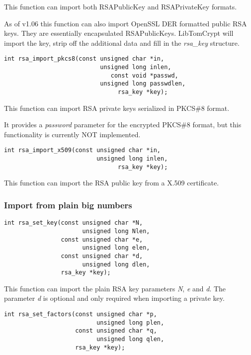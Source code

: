 \documentclass[synpaper]{book}
\begin{document}
This function can import both RSAPublicKey and RSAPrivateKey formats.

As of v1.06 this function can also import OpenSSL DER formatted public RSA keys.  They are essentially encapsulated RSAPublicKeys.  LibTomCrypt will
import the key, strip off the additional data and fill in the \textit{rsa\_key} structure.

\begin{verbatim}
int rsa_import_pkcs8(const unsigned char *in,
                           unsigned long inlen,
                              const void *passwd,
                           unsigned long passwdlen,
                                rsa_key *key);
\end{verbatim}

This function can import RSA private keys serialized in PKCS\#8 format.

It provides a \textit{password} parameter for the encrypted PKCS\#8 format, but this functionality is currently NOT implemented.

\begin{verbatim}
int rsa_import_x509(const unsigned char *in,
                          unsigned long inlen,
                                rsa_key *key);
\end{verbatim}

This function can import the RSA public key from a X.509 certificate.

\subsubsection{Import from plain big numbers}

\begin{verbatim}
int rsa_set_key(const unsigned char *N,
                      unsigned long Nlen,
                const unsigned char *e,
                      unsigned long elen,
                const unsigned char *d,
                      unsigned long dlen,
                rsa_key *key);
\end{verbatim}

This function can import the plain RSA key parameters \textit{N}, \textit{e} and \textit{d}.
The parameter \textit{d} is optional and only required when importing a private key.

\begin{verbatim}
int rsa_set_factors(const unsigned char *p,
                          unsigned long plen,
                    const unsigned char *q,
                          unsigned long qlen,
                    rsa_key *key);
\end{verbatim}
\end{document}
